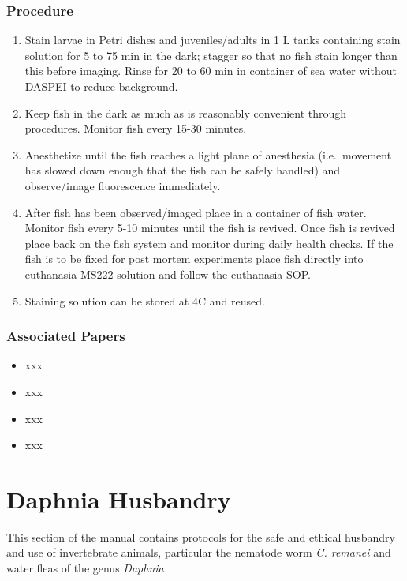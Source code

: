 \documentclass[
  letterpaper,
  DIV=11,
  numbers=noendperiod]{scrreprt}
\providecommand{\tightlist}{%
  \setlength{\itemsep}{0pt}\setlength{\parskip}{0pt}}\usepackage{longtable,booktabs,array}
\begin{document}
\hypertarget{procedure-60}{%
\section{Procedure}\label{procedure-60}}

\begin{enumerate}
\def\labelenumi{\arabic{enumi}.}
\tightlist
\item
  Stain larvae in Petri dishes and juveniles/adults in 1 L tanks
  containing stain solution for 5 to 75 min in the dark; stagger so that
  no fish stain longer than this before imaging. Rinse for 20 to 60 min
  in container of sea water without DASPEI to reduce background.
\item
  Keep fish in the dark as much as is reasonably convenient through
  procedures. Monitor fish every 15-30 minutes.
\item
  Anesthetize until the fish reaches a light plane of anesthesia
  (i.e.~movement has slowed down enough that the fish can be safely
  handled) and observe/image fluorescence immediately.
\item
  After fish has been observed/imaged place in a container of fish
  water. Monitor fish every 5-10 minutes until the fish is revived. Once
  fish is revived place back on the fish system and monitor during daily
  health checks. If the fish is to be fixed for post mortem experiments
  place fish directly into euthanasia MS222 solution and follow the
  euthanasia SOP.
\item
  Staining solution can be stored at 4C and reused.
\end{enumerate}

\hypertarget{associated-papers-40}{%
\section{Associated Papers}\label{associated-papers-40}}

\begin{itemize}
\tightlist
\item
  xxx
\item
  xxx
\item
  xxx
\item
  xxx
\end{itemize}

\part{Daphnia Husbandry}

This section of the manual contains protocols for the safe and ethical
husbandry and use of invertebrate animals, particular the nematode worm
\emph{C. remanei} and water fleas of the genus \emph{Daphnia}
\end{document}
